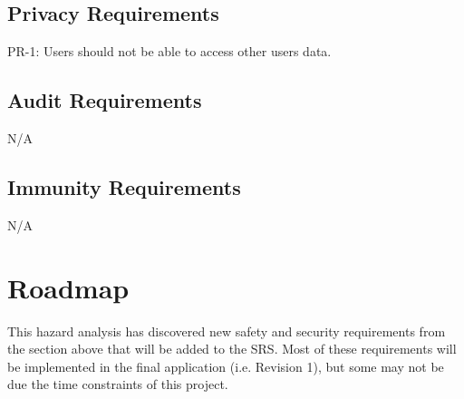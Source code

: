 \documentclass{article}
\begin{document}
\subsection{Privacy Requirements}
PR-1: Users should not be able to access other users data. 

\subsection{Audit Requirements}
N/A

\subsection{Immunity Requirements}
N/A


\section{Roadmap}

This hazard analysis has discovered new safety and security requirements from the section above that will be added to the SRS. Most of these requirements will be implemented in the final application (i.e. Revision 1), but some may not be due the time constraints of this project. 

\end{document}
